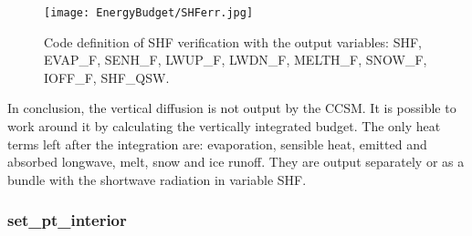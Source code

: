 \begin{figure}
\center
\texttt{[image: EnergyBudget/SHFerr.jpg]}
\caption{Code definition of SHF verification with the output variables: SHF, EVAP\_F, SENH\_F, LWUP\_F, LWDN\_F, MELTH\_F, SNOW\_F, IOFF\_F, SHF\_QSW.}
\label{shferr}
\end{figure}

In conclusion, the vertical diffusion is not output by the CCSM. It is possible to work around it by calculating the vertically integrated budget. The only heat terms left after the integration are: evaporation, sensible heat, emitted and absorbed longwave, melt, snow and ice runoff. They are output separately or as a bundle with the shortwave radiation in variable SHF. 

\subsubsection{set\_pt\_interior}

